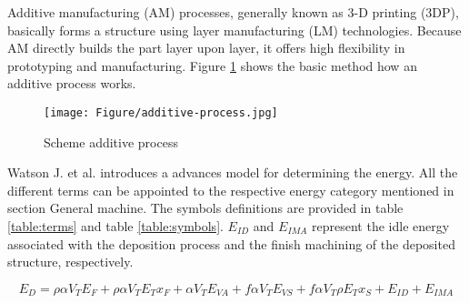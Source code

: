 Additive manufacturing (AM) processes, generally known as 3-D printing (3DP), basically forms a structure using layer manufacturing (LM) technologies. Because AM directly builds the part layer upon layer, it offers high flexibility in prototyping and manufacturing. Figure \ref{fig:additiveprocess} shows the basic method how an additive process works.

\begin{figure}[h!]
	\centering
	\texttt{[image: Figure/additive-process.jpg]}
	\caption{Scheme additive process \cite{Yoon2014}}
	\label{fig:additiveprocess}
\end{figure}


Watson J. et al. \cite{Watson2018} introduces a advances model for determining the energy. All the different terms can be appointed to the respective energy category mentioned in section General machine. The symbols definitions are provided in table \ref{table:terms} and table \ref{table:symbols}. $E_{ID}$ and $ E_{IMA} $ represent the idle energy associated with the deposition process and the finish machining of the deposited structure, respectively.

\begin{equation} \label{eq:AdditiveModel}
E_{D} = \rho \alpha V_T E_F +  \rho \alpha V_T E_T x_F + \alpha V_T E_{VA} + f {\alpha} V_T E_{VS} +  f \alpha V_T \rho E_T x_S + E_{ID} + E_{IMA}
\end{equation}

